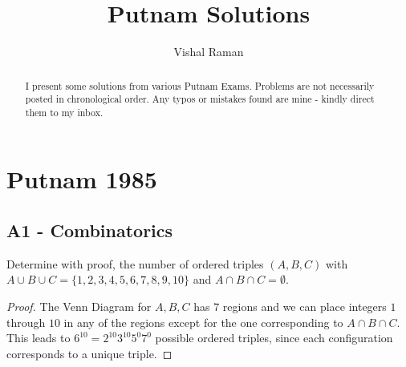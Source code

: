 \documentclass[11pt]{scrartcl}
\begin{document}
\title{Putnam Solutions}
\author{Vishal Raman}
\maketitle
\begin{abstract}
I present some solutions from various Putnam Exams.  Problems are not necessarily posted in chronological order.  Any typos or mistakes found are mine - kindly direct them to my inbox.
\end{abstract}
\tableofcontents
\pagebreak
\section{Putnam 1985}
\subsection{A1 - Combinatorics} 
\begin{Prob} Determine with proof, the number of ordered triples $(A, B, C)$ with $A\cup B\cup C = \{1, 2, 3, 4, 5, 6, 7, 8, 9, 10\}$ and $A \cap B \cap C = \emptyset$.   
\end{Prob}
\begin{proof}
The Venn Diagram for $A, B, C$ has $7$ regions and we can place integers $1$ through $10$ in any of the regions except for the one corresponding to $A \cap B \cap C$.  This leads to $6^{10} = \boxed{2^{10} 3^{10} 5^0 7^0}$ possible ordered triples, since each configuration corresponds to a unique triple.  
\end{proof}
\end{document}
